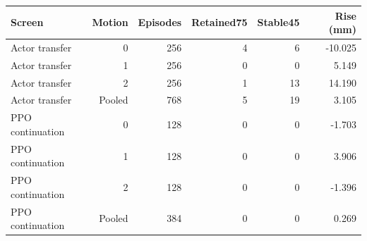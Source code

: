 \begin{tabular}{lrrrrr}
\toprule
Screen & Motion & Episodes & Retained75 & Stable45 & Rise (mm)\\
\midrule
Actor transfer & 0 & 256 & 4 & 6 & -10.025\\
Actor transfer & 1 & 256 & 0 & 0 & 5.149\\
Actor transfer & 2 & 256 & 1 & 13 & 14.190\\
Actor transfer & Pooled & 768 & 5 & 19 & 3.105\\
PPO continuation & 0 & 128 & 0 & 0 & -1.703\\
PPO continuation & 1 & 128 & 0 & 0 & 3.906\\
PPO continuation & 2 & 128 & 0 & 0 & -1.396\\
PPO continuation & Pooled & 384 & 0 & 0 & 0.269\\
\bottomrule
\end{tabular}

